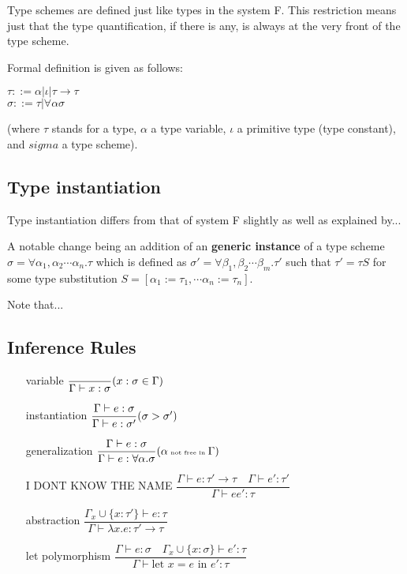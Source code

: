 Type schemes are defined just like types in the system F. This restriction means just that the type quantification, if there is any, is always at the very front of the type scheme.

Formal definition is given as follows:

$\tau ::= \alpha | \iota | \tau \rightarrow \tau$\\
$\sigma ::= \tau | \forall \alpha \sigma$

(where $\tau$ stands for a type, $\alpha$ a type variable, $\iota$ a primitive type (type constant), and $sigma$ a type scheme). %

\subsection{Type instantiation}

Type instantiation differs from that of system F slightly as well as explained  by... %

A notable change being an addition of an \textbf{generic instance} of a type scheme $\sigma = \forall \alpha_1, \alpha_2 \cdots \alpha_n . \tau$ which is defined as $\sigma' = \forall \beta_1, \beta_2 \cdots \beta_m . \tau'$ such that
$\tau' = \tau S$ for some type substitution $S = [\alpha_1 := \tau_1, \cdots \alpha_n := \tau_n]$.

Note that... %

\subsection{Inference Rules}

\begin{itemize}
    \item[variable] $\dfrac{}{\Gamma \vdash x : \sigma}\tiny{(x : \sigma \in \Gamma)}$
    \item[instantiation] $\dfrac{\Gamma \vdash e : \sigma}{\Gamma \vdash e : \sigma'}\tiny{(\sigma > \sigma')}$
    \item[generalization] $\dfrac{\Gamma \vdash e : \sigma}{\Gamma \vdash e : \forall \alpha . \sigma}\tiny{(\alpha \text{ not free in }\Gamma)}$
    \item[I DONT KNOW THE NAME] $\dfrac{\Gamma \vdash e : \tau' \rightarrow \tau \quad \Gamma \vdash e' : \tau' }{\Gamma \vdash e e' : \tau}$ %
    \item[abstraction] $\dfrac{\Gamma_x \cup \{x : \tau'\} \vdash e : \tau}{\Gamma \vdash \lambda x . e : \tau' \rightarrow \tau}$ %
    \item[let polymorphism] $\dfrac{\Gamma \vdash e : \sigma \quad \Gamma_x \cup \{x :\sigma\} \vdash e' : \tau}{\Gamma \vdash \text{let } x = e \text{ in } e' : \tau}$
\end{itemize}

